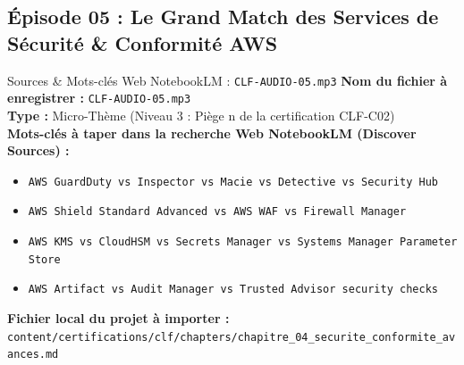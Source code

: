 \documentclass[11pt,a4paper]{article}
\begin{document}
\subsection{Épisode 05 : Le Grand Match des Services de Sécurité \& Conformité AWS}
\begin{sourcebox}{Sources \& Mots-clés Web NotebookLM : \texttt{CLF-AUDIO-05.mp3}}
\textbf{Nom du fichier à enregistrer :} \texttt{CLF-AUDIO-05.mp3}\\
\textbf{Type :} Micro-Thème (Niveau 3 : Piège n de la certification CLF-C02)\\
\textbf{Mots-clés à taper dans la recherche Web NotebookLM (Discover Sources) :}
\begin{itemize}[noitemsep]
    \item \texttt{AWS GuardDuty vs Inspector vs Macie vs Detective vs Security Hub}
    \item \texttt{AWS Shield Standard Advanced vs AWS WAF vs Firewall Manager}
    \item \texttt{AWS KMS vs CloudHSM vs Secrets Manager vs Systems Manager Parameter Store}
    \item \texttt{AWS Artifact vs Audit Manager vs Trusted Advisor security checks}
\end{itemize}
\textbf{Fichier local du projet à importer :}
\texttt{content/certifications/clf/chapters/chapitre_04_securite_conformite_avances.md}
\end{sourcebox}
\end{document}
